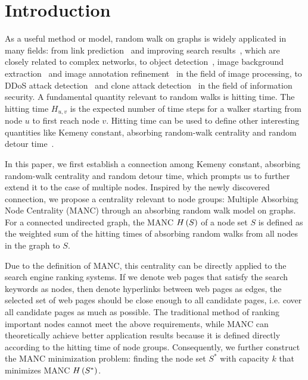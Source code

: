 \documentclass[sigconf]{acmart}
\begin{document}
\section{Introduction}\label{sec:intro}

As a useful method or model, random walk on graphs is widely applicated in many fields: from link prediction~\cite{YiGuWeTiHa10} and improving search results~\cite{LiPeMaQiWeQi10}, which are closely related to complex networks, to object detection~\cite{GoViHuRa10}, image background extraction~\cite{HuWaYeChLa16} and image annotation refinement~\cite{WaJiZhZh10} in the field of image processing, to DDoS attack detection~\cite{XuZhXiYu14} and clone attack detection~\cite{ZeCaZhGuXi10} in the field of information security.
A fundamental quantity relevant to random walks is hitting time.
The hitting time \(H_{u,v}\) is the expected number of time steps for a walker starting from node \(u\) to first reach node \(v\).
Hitting time can be used to define other interesting quantities like Kemeny constant, absorbing random-walk centrality and random detour time~\cite{RaZh13}.

In this paper, we first establish a connection among Kemeny constant, absorbing random-walk centrality and random detour time, which prompts us to further extend it to the case of multiple nodes.
Inspired by the newly discovered connection, we propose a centrality relevant to node groups: Multiple Absorbing Node Centrality (MANC) through an absorbing random walk model on graphs.
For a connected undirected graph, the MANC \(H\left(S\right)\) of a node set \(S\) is defined as the weighted sum of the hitting times of absorbing random walks from all nodes in the graph to \(S\).

Due to the definition of MANC, this centrality can be directly applied to the search engine ranking systems.
If we denote web pages that satisfy the search keywords as nodes, then denote hyperlinks between web pages as edges, the selected set of web pages should be close enough to all candidate pages, i.e. cover all candidate pages as much as possible.
The traditional method of ranking important nodes cannot meet the above requirements, while MANC can theoretically achieve better application results because it is defined directly according to the hitting time of node groups.
Consequently, we further construct the MANC minimization problem: finding the node set \(S^*\) with capacity \(k\) that minimizes MANC \(H\left(S^*\right)\).
\end{document}
